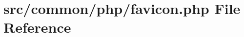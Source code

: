 \hypertarget{favicon_8php}{}\section{src/common/php/favicon.php File Reference}
\label{favicon_8php}
